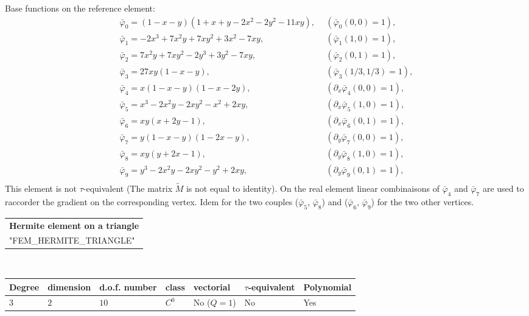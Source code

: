 \documentclass[11pt,a4paper]{article}
\begin{document}
Base functions on the reference element:
$$
  \begin{array}{ll}
 \bar{\varphi}_0 = (1-x-y)(1+x+y-2x^2-2y^2-11xy),~~ & (\bar{\varphi}_0(0,0) = 1), \\
 \bar{\varphi}_1 = -2x^3 + 7 x^2y + 7xy^2 + 3x^2 - 7xy, & (\bar{\varphi}_1(1,0) = 1), \\
 \bar{\varphi}_2 = 7x^2y + 7xy^2 - 2y^3+3y^2-7xy, & (\bar{\varphi}_2(0,1) = 1), \\
 \bar{\varphi}_3 = 27xy(1-x-y), & (\bar{\varphi}_3(1/3,1/3) = 1), \\
 \bar{\varphi}_4 = x(1-x-y)(1-x-2y), & (\partial_x\bar{\varphi}_4(0,0) = 1), \\
 \bar{\varphi}_5 = x^3-2x^2y-2xy^2-x^2+2xy, & (\partial_x\bar{\varphi}_5(1,0) = 1), \\
 \bar{\varphi}_6 = xy(x+2y-1), & (\partial_x\bar{\varphi}_6(0,1) = 1), \\
 \bar{\varphi}_7 = y(1-x-y)(1-2x-y), & (\partial_y\bar{\varphi}_7(0,0) = 1), \\
 \bar{\varphi}_8 = xy(y+2x-1), & (\partial_y\bar{\varphi}_8(1,0) = 1), \\
 \bar{\varphi}_9 = y^3-2x^2y-2xy^2-y^2+2xy, & (\partial_y\bar{\varphi}_9(0,1) = 1), \\
  
  \end{array}
$$
This element is not \mbox{$\tau$-equivalent} (The matrix $\tilde{M}$ is not equal to identity). On the real element linear combinaisons of $\bar{\varphi}_4$ and $\bar{\varphi}_7$ are used to raccorder the gradient on the corresponding vertex. Idem for the two couples ($\bar{\varphi}_5$, $\bar{\varphi}_8$) and  ($\bar{\varphi}_6$, $\bar{\varphi}_9$) for the two other vertices.  

\begin{center}
\begin{tabular}{|m{16.11cm}|} \hline 
{ \bf Hermite element on a triangle}\\
"FEM\_HERMITE\_TRIANGLE"
\end{tabular} \\ \vspace{-1pt} 
\begin{tabular}{|m{2cm}|m{2cm}|m{2.5cm}|m{1.2cm}|m{2cm}|m{2cm}|m{1.8cm}|} \hline 
Degree & dimension & d.o.f. number & class & vectorial & \mbox{$\tau$-equivalent} & Polynomial\\ \hline
$3$ & $2$ & $10$ & $C^0$ & No \mbox{($Q = 1$)} & No & Yes\\ \hline
\end{tabular}
\end{center}
\end{document}
